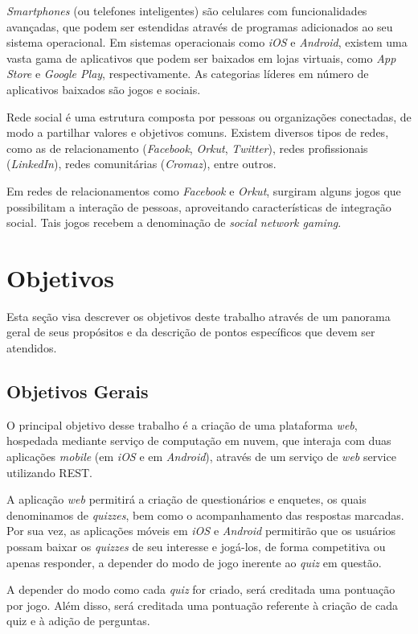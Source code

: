         \emph{Smartphones} (ou telefones inteligentes) são celulares com funcionalidades avançadas, que podem ser estendidas através de programas adicionados ao seu sistema operacional.  Em sistemas operacionais como \emph{iOS} e \emph{Android}, existem uma vasta gama de aplicativos que podem ser baixados em lojas virtuais, como \emph{App Store} e \emph{Google Play}, respectivamente. As categorias líderes em número de aplicativos baixados são jogos e sociais.
		
        Rede social é uma estrutura composta por pessoas ou organizações conectadas, de modo a partilhar valores e objetivos comuns. Existem diversos tipos de redes, como as de relacionamento (\emph{Facebook}, \emph{Orkut}, \emph{Twitter}), redes profissionais (\emph{LinkedIn}), redes comunitárias (\emph{Cromaz}), entre outros.      
		
        Em redes de relacionamentos como \emph{Facebook} e \emph{Orkut}, surgiram alguns jogos que possibilitam a interação de pessoas, aproveitando características de integração social. Tais jogos recebem a denominação de \emph{social network gaming}.
\section{Objetivos}
 
	Esta seção visa descrever os objetivos deste trabalho através de um panorama geral de seus propósitos e da descrição de pontos específicos que devem ser atendidos.
 
\subsection{Objetivos Gerais}
 
        O principal objetivo desse trabalho é a criação de uma plataforma \emph{web}, hospedada mediante serviço de computação em nuvem, que interaja com duas aplicações \emph{mobile} (em \emph{iOS} e em \emph{Android}), através de um serviço de \emph{web} service utilizando \ac{REST}.
		
		A aplicação \emph{web} permitirá a criação de questionários e enquetes, os quais denominamos de \emph{quizzes}, bem como o acompanhamento das respostas marcadas.  Por sua vez, as aplicações móveis em \emph{iOS} e \emph{Android} permitirão que os usuários possam baixar os \emph{quizzes} de seu interesse e jogá-los, de forma competitiva ou apenas responder, a depender do modo de jogo inerente ao \emph{quiz} em questão.	
			
		A depender do modo como cada \emph{quiz} for criado, será creditada uma pontuação por jogo. Além disso, será creditada uma pontuação referente à criação de cada quiz e à adição de perguntas.
 
